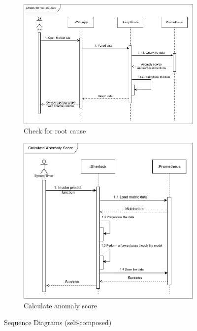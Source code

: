 \begin{figure}[H]
    \centering
    \begin{subfigure}[b]{0.70\textwidth}
        \centering
        \includegraphics[width=\textwidth]{assets/system-design/sequence-diagram-1.png}
        \caption{Check for root cause}
    \end{subfigure}
    \hfill
    \begin{subfigure}[b]{0.70\textwidth}
        \centering
        \includegraphics[width=\textwidth]{assets/system-design/sequence-diagram-2.png}
        \caption{Calculate anomaly score}
    \end{subfigure}
    \hfill
       \caption{Sequence Diagrams (self-composed)}
\end{figure}

